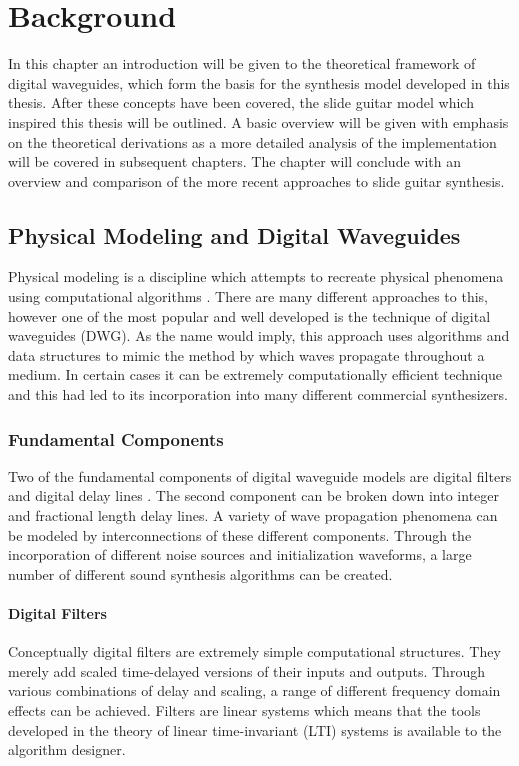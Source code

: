\documentclass[main.tex]{subfiles}
\begin{document}
\chapter{Background}
\label{ch:background}
In this chapter an introduction will be given to the theoretical framework of digital waveguides, which form the basis for the synthesis model developed in this thesis. After these concepts have been covered, the slide guitar model which inspired this thesis will be outlined. A basic overview will be given with emphasis on the theoretical derivations as a more detailed analysis of the implementation will be covered in subsequent chapters. The chapter will conclude with an overview and comparison of the more recent approaches to slide guitar synthesis.

\section{Physical Modeling and Digital Waveguides}
Physical modeling is a discipline which attempts to recreate physical phenomena using computational algorithms . There are many different approaches to this, however one of the most popular and well developed is the technique of digital waveguides (DWG). As the name would imply, this approach uses algorithms and data structures to mimic the method by which waves propagate throughout a medium. In certain cases it can be extremely computationally efficient technique and this had led to its incorporation into many different commercial synthesizers.

\subsection{Fundamental Components}
Two of the fundamental components of digital waveguide models are digital filters and digital delay lines . The second component can be broken down into integer and fractional length delay lines. A variety of wave propagation phenomena can be modeled by interconnections of these different components. Through the incorporation of different noise sources and initialization waveforms, a large number of different sound synthesis algorithms can be created.

\subsubsection{Digital Filters}
\label{subsec:Ch2DigitalFilters}
Conceptually digital filters are extremely simple computational structures. They merely add scaled time-delayed versions of their inputs and outputs. Through various combinations of delay and scaling, a range of different frequency domain effects can be achieved. Filters are linear systems which means that the tools developed in the theory of linear time-invariant (LTI) systems is available to the algorithm designer. 
\end{document}
